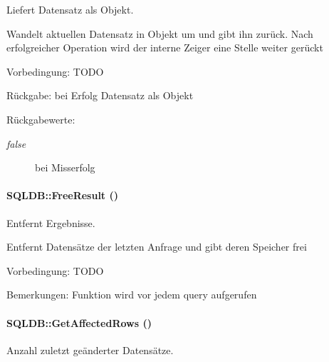 Liefert Datensatz als Objekt. 

Wandelt aktuellen Datensatz in Objekt um und gibt ihn zurück. Nach erfolgreicher Operation wird der interne Zeiger eine Stelle weiter gerückt \begin{Desc}
\item[Vorbedingung:]TODO \end{Desc}
\begin{Desc}
\item[R\"{u}ckgabe:]bei Erfolg Datensatz als Objekt \end{Desc}
\begin{Desc}
\item[R\"{u}ckgabewerte:]
\begin{description}
\item[{\em false}]bei Misserfolg \end{description}
\end{Desc}
\hypertarget{classSQLDB_e7da8a2f993c4bb91167a150e07e8b52}{
\paragraph[FreeResult]{\setlength{\rightskip}{0pt plus 5cm}SQLDB::Free\-Result ()}\hfill}
\label{classSQLDB_e7da8a2f993c4bb91167a150e07e8b52}


Entfernt Ergebnisse. 

Entfernt Datensätze der letzten Anfrage und gibt deren Speicher frei \begin{Desc}
\item[Vorbedingung:]TODO \end{Desc}
\begin{Desc}
\item[Bemerkungen:]Funktion wird vor jedem query aufgerufen \end{Desc}
\hypertarget{classSQLDB_8f3c28ae4ed5941c043459d6204a887b}{
\paragraph[GetAffectedRows]{\setlength{\rightskip}{0pt plus 5cm}SQLDB::Get\-Affected\-Rows ()}\hfill}
\label{classSQLDB_8f3c28ae4ed5941c043459d6204a887b}


Anzahl zuletzt geänderter Datensätze. 

